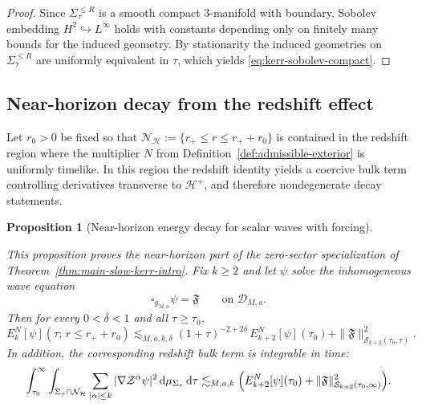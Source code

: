 \documentclass[11pt]{article}
\numberwithin{equation}{section}
\theoremstyle{plain}
\newtheorem{proposition}[theorem]{Proposition}
\theoremstyle{definition}
\theoremstyle{remark}
\newcommand{\dd}{\mathrm{d}}
\begin{document}
\begin{proof}
Since $\Sigma_{\tau}^{\le R}$ is a smooth compact $3$-manifold with boundary, Sobolev embedding $H^{2}\hookrightarrow L^{\infty}$ holds with constants depending only on finitely many bounds for the induced geometry.
By stationarity the induced geometries on $\Sigma_{\tau}^{\le R}$ are uniformly equivalent in $\tau$, which yields \eqref{eq:kerr-sobolev-compact}.
\end{proof}

\subsection{Near-horizon decay from the redshift effect}\label{subsec:kerr-near-horizon-decay}

Let $r_{0}>0$ be fixed so that $\mathcal N_{\mathcal H}:=\{r_{+}\le r\le r_{+}+r_{0}\}$ is contained in the redshift region where the multiplier $N$ from Definition~\ref{def:admissible-exterior} is uniformly timelike.
In this region the redshift identity yields a coercive bulk term controlling derivatives transverse to $\mathcal H^{+}$, and therefore nondegenerate decay statements.

\begin{proposition}[Near-horizon energy decay for scalar waves with forcing]\label{prop:kerr-horizon-energy-decay}

\noindent\emph{This proposition proves the near-horizon part of the zero-sector specialization of Theorem~\ref{thm:main-slow-kerr-intro}.}
Fix $k\ge2$ and let $\psi$ solve the inhomogeneous wave equation
\begin{equation}
\square_{g_{M,a}}\psi=\mathfrak{F}
\qquad\text{on }\mathcal D_{M,a}.
\end{equation}
Then for every $0<\delta<1$ and all $\tau\ge\tau_{0}$,
\begin{equation}\label{eq:kerr-horizon-energy-decay}
E^{N}_{k}[\psi](\tau;\,r\le r_{+}+r_{0})
\lesssim_{M,a,k,\delta}
(1+\tau)^{-2+2\delta}\,E^{N}_{k+2}[\psi](\tau_{0})
+\|\mathfrak{F}\|_{\mathcal S_{k+2}(\tau_{0},\tau)}^{2}.
\end{equation}
In addition, the corresponding redshift bulk term is integrable in time:
\begin{equation}\label{eq:kerr-horizon-bulk}
\int_{\tau_{0}}^{\infty}\int_{\Sigma_{\tau}\cap\mathcal N_{\mathcal H}}\sum_{|\alpha|\le k}
|\nabla \mathcal Z^{\alpha}\psi|^{2}\,\dd\mu_{\Sigma_{\tau}}\,\dd\tau
\lesssim_{M,a,k}
\Bigl(
E^{N}_{k+2}[\psi](\tau_{0})
+
\|\mathfrak{F}\|_{\mathcal S_{k+2}(\tau_{0},\infty)}^{2}
\Bigr).
\end{equation}
\end{proposition}
\end{document}
